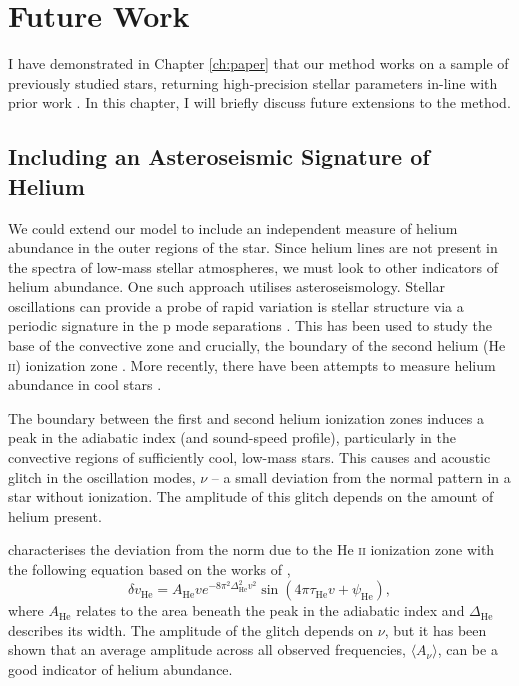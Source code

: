 \chapter{Future Work}\label{ch:future}

I have demonstrated in Chapter \ref{ch:paper} that our method works on a sample of previously studied stars, returning high-precision stellar parameters in-line with prior work \citep{Serenelli.Johnson.ea2017}. In this chapter, I will briefly discuss future extensions to the method.

\section{Including an Asteroseismic Signature of Helium}

We could extend our model to include an independent measure of helium abundance in the outer regions of the star. Since helium lines are not present in the spectra of low-mass stellar atmospheres, we must look to other indicators of helium abundance. One such approach utilises asteroseismology. Stellar oscillations can provide a probe of rapid variation is stellar structure via a periodic signature in the p mode separations \citep{Broomhall.Miglio.ea2014}. This has been used to study the base of the convective zone \citep{Monteiro.Christensen-Dalsgaard.ea2000} and crucially, the boundary of the second helium (He \textsc{ii}) ionization zone \citep{Houdek.Gough2007}. More recently, there have been attempts to measure helium abundance in cool stars \citep{Mazumdar.Monteiro.ea2014, Corsaro.DeRidder.ea2015, Verma.Raodeo.ea2017}.

The boundary between the first and second helium ionization zones induces a peak in the adiabatic index (and sound-speed profile), particularly in the convective regions of sufficiently cool, low-mass stars. This causes and acoustic glitch in the oscillation modes, $\nu$ -- a small deviation from the normal pattern in a star without ionization. The amplitude of this glitch depends on the amount of helium present.

\citet{Verma.Raodeo.ea2019} characterises the deviation from the norm due to the He \textsc{ii} ionization zone with the following equation based on the works of \citep{Houdek.Gough2007},
\begin{equation}
    \delta v_{\mathrm{He}}=A_{\mathrm{He}} v e^{-8 \pi^{2} \Delta_{\mathrm{He}}^{2} v^{2}} \sin \left(4 \pi \tau_{\mathrm{He}} v+\psi_{\mathrm{He}}\right),
\end{equation}
where $A_{\mathrm{He}}$ relates to the area beneath the peak in the adiabatic index and $\Delta_{\mathrm{He}}$ describes its width. The amplitude of the glitch depends on $\nu$, but it has been shown that an average amplitude across all observed frequencies, $\langle A_\nu \rangle$, can be a good indicator of helium abundance.

